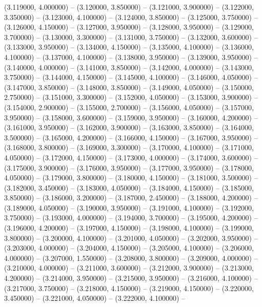 (3.119000, 4.000000) -- 
(3.120000, 3.850000) -- 
(3.121000, 3.900000) -- 
(3.122000, 3.350000) -- 
(3.123000, 4.100000) -- 
(3.124000, 3.850000) -- 
(3.125000, 3.750000) -- 
(3.126000, 4.150000) -- 
(3.127000, 3.950000) -- 
(3.128000, 3.950000) -- 
(3.129000, 3.700000) -- 
(3.130000, 3.300000) -- 
(3.131000, 3.750000) -- 
(3.132000, 3.600000) -- 
(3.133000, 3.950000) -- 
(3.134000, 4.150000) -- 
(3.135000, 4.100000) -- 
(3.136000, 4.100000) -- 
(3.137000, 4.100000) -- 
(3.138000, 3.950000) -- 
(3.139000, 3.950000) -- 
(3.140000, 4.000000) -- 
(3.141000, 3.850000) -- 
(3.142000, 4.000000) -- 
(3.143000, 3.750000) -- 
(3.144000, 4.150000) -- 
(3.145000, 4.100000) -- 
(3.146000, 4.050000) -- 
(3.147000, 3.850000) -- 
(3.148000, 3.850000) -- 
(3.149000, 4.050000) -- 
(3.150000, 2.750000) -- 
(3.151000, 3.300000) -- 
(3.152000, 4.050000) -- 
(3.153000, 3.900000) -- 
(3.154000, 2.900000) -- 
(3.155000, 2.700000) -- 
(3.156000, 4.050000) -- 
(3.157000, 3.950000) -- 
(3.158000, 3.600000) -- 
(3.159000, 3.950000) -- 
(3.160000, 4.200000) -- 
(3.161000, 3.950000) -- 
(3.162000, 3.900000) -- 
(3.163000, 3.850000) -- 
(3.164000, 3.500000) -- 
(3.165000, 4.200000) -- 
(3.166000, 4.150000) -- 
(3.167000, 3.950000) -- 
(3.168000, 3.800000) -- 
(3.169000, 3.300000) -- 
(3.170000, 4.100000) -- 
(3.171000, 4.050000) -- 
(3.172000, 4.150000) -- 
(3.173000, 4.000000) -- 
(3.174000, 3.600000) -- 
(3.175000, 3.900000) -- 
(3.176000, 3.950000) -- 
(3.177000, 3.950000) -- 
(3.178000, 4.050000) -- 
(3.179000, 3.800000) -- 
(3.180000, 4.150000) -- 
(3.181000, 3.500000) -- 
(3.182000, 3.450000) -- 
(3.183000, 4.050000) -- 
(3.184000, 4.150000) -- 
(3.185000, 3.850000) -- 
(3.186000, 3.200000) -- 
(3.187000, 2.450000) -- 
(3.188000, 4.200000) -- 
(3.189000, 4.050000) -- 
(3.190000, 3.950000) -- 
(3.191000, 4.100000) -- 
(3.192000, 3.750000) -- 
(3.193000, 4.000000) -- 
(3.194000, 3.700000) -- 
(3.195000, 4.200000) -- 
(3.196000, 4.200000) -- 
(3.197000, 4.150000) -- 
(3.198000, 4.100000) -- 
(3.199000, 3.800000) -- 
(3.200000, 4.100000) -- 
(3.201000, 4.050000) -- 
(3.202000, 3.950000) -- 
(3.203000, 4.000000) -- 
(3.204000, 4.150000) -- 
(3.205000, 4.100000) -- 
(3.206000, 4.000000) -- 
(3.207000, 1.550000) -- 
(3.208000, 3.800000) -- 
(3.209000, 4.000000) -- 
(3.210000, 4.000000) -- 
(3.211000, 3.600000) -- 
(3.212000, 3.900000) -- 
(3.213000, 4.200000) -- 
(3.214000, 3.950000) -- 
(3.215000, 3.950000) -- 
(3.216000, 4.100000) -- 
(3.217000, 3.750000) -- 
(3.218000, 4.150000) -- 
(3.219000, 4.150000) -- 
(3.220000, 3.450000) -- 
(3.221000, 4.050000) -- 
(3.222000, 4.100000) -- 
